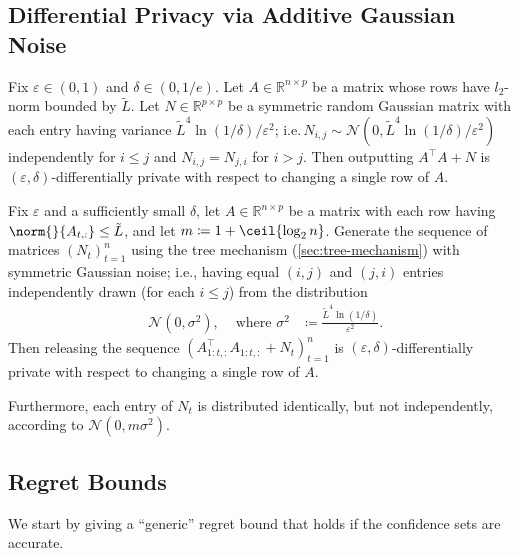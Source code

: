 \documentclass{article}
\newcommand{\defeq}{\coloneq}
\newcommand{\Real}{\mathds{R}}
\DeclarePairedDelimiter{\ceil}\lceil\rceil
\providecommand\transp{\top}
\let\transpsymbol\transp
\renewcommand{\transp}[1]{#1^\transpsymbol}
\newcommand{\Normal}{\mathcal{N}}
\newcommand{\XtX}[1]{\transp{#1}{#1}}
\begin{document}
\subsection{Differential Privacy via Additive Gaussian Noise}
\label{sec:dp-gauss}

\begin{theorem}%
  \label{thm:analyze-gauss}
  Fix $\varepsilon\in(0,1)$ and $\delta\in(0,1/e)$.  Let
  $A\in\Real^{n\times p}$ be a matrix whose rows have $l_2$-norm
  bounded by $\tilde L$.  Let $N\in\Real^{p\times p}$ be a symmetric
  random Gaussian matrix with each entry having variance
  $\tilde L^4\ln(1/\delta)/\varepsilon^2$;
  i.e.\,$N_{i,j}\sim\Normal(0,\tilde L^4\ln(1/\delta)/\varepsilon^2)$
  independently for $i \le j$ and $N_{i,j} = N_{j,i}$ for $i > j$.
  Then outputting $\XtX{A} + N$ is
  $(\varepsilon,\delta)$-differentially private with respect to
  changing a single row of $A$.
\end{theorem}

\begin{theorem}%
  \label{thm:analyze-gauss-cont}
  Fix $\varepsilon$ and a sufficiently small $\delta$, let
  $A\in\Real^{n\times p}$ be a matrix with each row having
  $\norm{}{A_{t,:}} \le \tilde L$, and let
  $m \defeq 1 + \ceil{\log_2n}$.  Generate the sequence of matrices
  $(N_t)_{t=1}^n$ using the tree mechanism (\cref{sec:tree-mechanism})
  with symmetric Gaussian noise; i.e., having equal $(i,j)$ and
  $(j,i)$ entries independently drawn (for each $i \le j$) from the
  distribution
  \begin{align*}
    &\Normal(0, \sigma^2),
    &\text{ where } \sigma^2
    &\defeq \frac{\tilde L^4 \ln(1/\delta)}{\varepsilon^2}.
  \end{align*}
  Then releasing the sequence $(\XtX{A_{1:t,:}} + N_t)_{t=1}^n$ is
  $(\varepsilon,\delta)$-differentially private with respect to
  changing a single row of $A$.

  Furthermore, each entry of $N_t$ is distributed identically, but not
  independently, according to $\Normal(0, m\sigma^2)$.
\end{theorem}

\subsection{Regret Bounds}
\label{sec:regret-bounds}

We start by giving a ``generic'' regret bound
that holds if the confidence sets are accurate.
\end{document}
